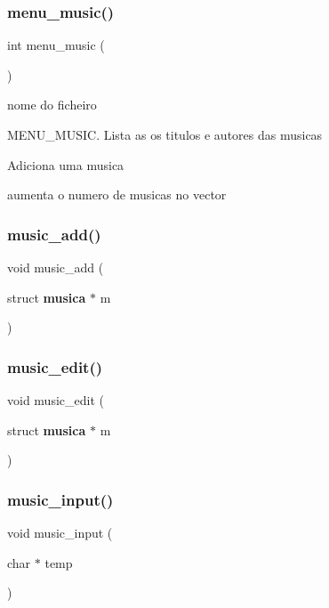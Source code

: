 \subsubsection{menu\_music()}
{\footnotesize\ttfamily int menu\+\_\+music (\begin{DoxyParamCaption}{ }\end{DoxyParamCaption})}



nome do ficheiro 

M\+E\+N\+U\+\_\+\+M\+U\+S\+IC. Lista as os titulos e autores das musicas

Adiciona uma musica

aumenta o numero de musicas no vector \mbox{\label{menu__music_8c_a0601269df7d88d6fe6b66fbbbdc589cb}} 
\subsubsection{music\_add()}
{\footnotesize\ttfamily void music\+\_\+add (\begin{DoxyParamCaption}\item[{struct \textbf{ musica} $\ast$}]{m }\end{DoxyParamCaption})}

\mbox{\label{menu__music_8c_a86e0526889a472c55b6599489e04e164}} 
\subsubsection{music\_edit()}
{\footnotesize\ttfamily void music\+\_\+edit (\begin{DoxyParamCaption}\item[{struct \textbf{ musica} $\ast$}]{m }\end{DoxyParamCaption})}

\mbox{\label{menu__music_8c_a3cde506a190f5edc6ccd1a9f92f00afc}} 
\subsubsection{music\_input()}
{\footnotesize\ttfamily void music\+\_\+input (\begin{DoxyParamCaption}\item[{char $\ast$}]{temp }\end{DoxyParamCaption})}

